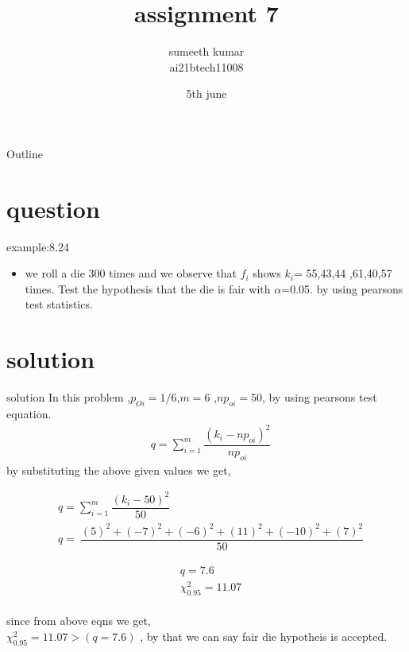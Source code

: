 \documentclass{beamer}
\title{assignment 7}
\author{sumeeth kumar \\ ai21btech11008}
\date{5th june}
\begin{document}
\begin{frame}
    \titlepage 
\end{frame}

\logo{}


\begin{frame}{Outline}
    \tableofcontents
\end{frame}


\section{question}
\begin{frame}{example:8.24}
\begin{itemize}
    \item we roll a die 300 times and we observe that $f_i$ shows $k_i$= 55,43,44
    ,61,40,57 times. Test the hypothesis that the die is fair with $\alpha$=0.05.
    by using pearsons test statistics.\end{itemize}


\end{frame}
\section{solution}
\begin{frame}{solution}
    In this problem ,$p_{Oi} = 1/6$,$ m = 6$ ,$ np_{oi} = 50$, by using pearsons
    test equation.
    \begin{align}
       &{q=\sum_{i=1}^m \dfrac{(k_i- np_{oi})^2}{ np_{oi}}}
    \end{align}
     by substituting the above given values we get,
     
     \begin{align}
         &{q=\sum_{i=1}^m \dfrac{(k_i- 50)^2}{ 50}} \\[8pt]
           &{q=\ \dfrac{(5)^2+(-7)^2+(-6)^2+(11)^2+(-10)^2+(7)^2}{ 50}}
     \end{align}
\end{frame}
    \begin{frame}
        \begin{align}
            &q= 7.6\\[8pt]
            &\chi_{0.95}^2=11.07
        \end{align}\\
        since from above eqns we get,\\ $ \chi_{0.95}^2 =11.07>(q= 7.6)$ , by that we can say fair die hypotheis is accepted. 
    \end{frame}
\end{document}
